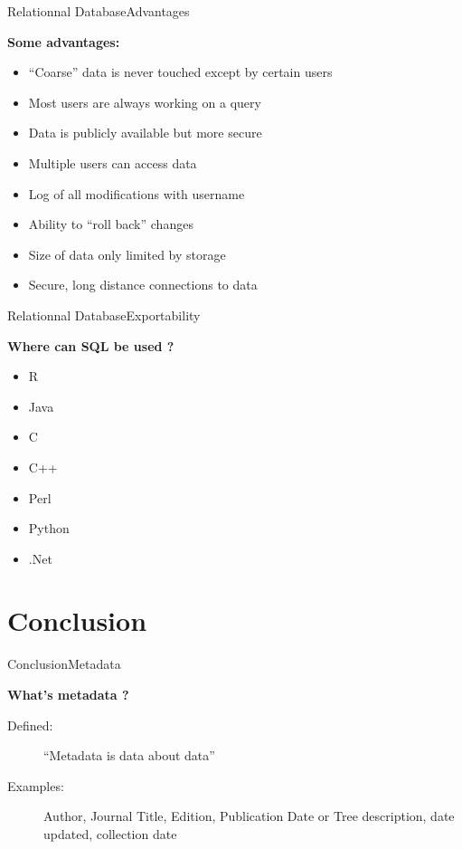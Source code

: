 \documentclass[table]{eecslides}
\begin{document}

\begin{frame}{Relationnal Database}{Advantages}

\textbf{Some advantages:}
	\begin{itemize}
		\item “Coarse” data is never touched except by certain users
		\item Most users are always working on a query
		\item Data is publicly available but more secure 
		\item Multiple users can access data
		\item Log of all modifications with username
		\item Ability to “roll back” changes
		\item Size of data only limited by storage
		\item Secure, long distance connections to data
	\end{itemize}

\end{frame}



\begin{frame}{Relationnal Database}{Exportability}

\textbf{Where can SQL be used ?}
	\begin{itemize}
			\item R
			\item Java
			\item C
			\item C++
			\item Perl
			\item Python
			\item .Net 
	\end{itemize}
\end{frame}




\section{Conclusion}


\begin{frame}{Conclusion}{Metadata}

\textbf{What's metadata ?}
	\begin{description}
		\item [Defined:] “Metadata is data about data”
		\item [Examples:] Author, Journal Title, Edition, Publication Date or Tree description, date updated, collection date
	\end{description}
\end{frame}
\end{document}
